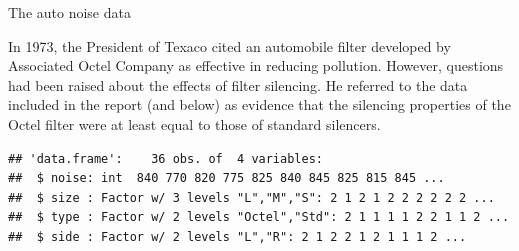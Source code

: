 \begin{frame}[fragile]{The auto noise data}
  
  In 1973, the President of Texaco cited an automobile filter
  developed by Associated Octel Company as effective in reducing
  pollution. However, questions had been raised about the effects of
  filter silencing. He referred to the data included in the report
  (and below) as evidence
  that the silencing properties of the Octel filter were at least
  equal to those of standard silencers. 
 
\begin{knitrout}
\color{fgcolor}\begin{kframe}
\begin{alltt}
\hlkwb{=}\hlstd{(}\hlstd{,}
\end{alltt}
\begin{verbatim}
## 'data.frame':	36 obs. of  4 variables:
##  $ noise: int  840 770 820 775 825 840 845 825 815 845 ...
##  $ size : Factor w/ 3 levels "L","M","S": 2 1 2 1 2 2 2 2 2 2 ...
##  $ type : Factor w/ 2 levels "Octel","Std": 2 1 1 1 1 2 2 1 1 2 ...
##  $ side : Factor w/ 2 levels "L","R": 2 1 2 2 1 2 1 1 1 2 ...
\end{verbatim}
\end{kframe}
\end{knitrout}
  
\end{frame}

